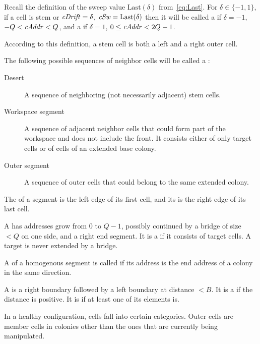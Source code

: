 \documentclass[12pt]{memoir}
\renewcommand{\le}{\leq}
\newcommand{\fld}[1]{\ensuremath{\textit{#1\/}}}
\def\B{B}
\newcommand{\Q}{Q}
\newcommand{\cAddr}{\fld{cAddr}}
\newcommand{\cDrift}{\fld{cDrift}}
\newcommand{\cSweep}{\fld{cSw}}
\newcommand{\Last}{\mathrm{Last}}
\begin{document}
\begin{definition}\label{def:outer-cells}
    Recall the definition of the sweep value
    \(  \Last(\delta)  \) from~\eqref{eq:Last}.
    For \( \delta \in \{ -1,1 \} \), if a cell is stem or
\( \cDrift = \delta \),  \( \cSweep = \Last(\delta) \)
    then it will be called a  if
    \( \delta = -1 \), \( -\Q< \cAddr < \Q \),  and a  
    if \( \delta = 1 \), \( 0\le\cAddr<2\Q-1 \).
\end{definition}

According to this definition, a stem cell is both a left and a right outer cell.

\begin{definition}[Segments]\label{def:segments}
The following possible sequences of neighbor cells will be called a :
\begin{description}
\item[Desert] A sequence of neighboring (not necessarily adjacent) stem cells.

\item[Workspace segment]  A sequence of adjacent neighbor 
cells that could form part of the workspace and does not include the front.
It consists either of only target cells or of cells of an extended base colony.

\item[Outer segment]
A sequence of outer cells that could belong to the same extended colony.
\end{description}

The  of a segment is the left edge of its first cell, and its  is 
the right edge of its last cell.

A  has addresses grow from \( 0 \) to \( \Q-1 \), 
possibly continued by a bridge of size \( <\Q \) on one side,
and a right end segment.
It is a  if it consists of target cells.
A target is never extended by a bridge.

A  of a homogenous segment is called  if its address is the end 
address of a colony in the same direction.

A  
is a right boundary followed by a left boundary at distance \( <\B \).
It is a  if the distance is positive.
It is  if at least one of its elements is.
\end{definition}

In a healthy configuration, cells fall into certain categories.
Outer cells are member cells in colonies other than the ones that 
are currently being manipulated.
\end{document}
